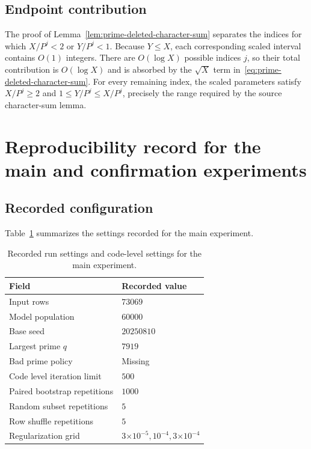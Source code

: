 \documentclass[12pt,reqno]{amsart}
\numberwithin{equation}{section}
\theoremstyle{plain}
\theoremstyle{definition}
\theoremstyle{remark}
\begin{document}
\subsection{Endpoint contribution}

The proof of Lemma~\ref{lem:prime-deleted-character-sum} separates the indices for which $X/P^j<2$ or $Y/P^j<1$.
Because $Y\leq X$, each corresponding scaled interval contains $O(1)$ integers.
There are $O(\log X)$ possible indices $j$, so their total contribution is $O(\log X)$ and is absorbed by the $\sqrt X$ term in~\eqref{eq:prime-deleted-character-sum}.
For every remaining index, the scaled parameters satisfy $X/P^j\geq2$ and $1\leq Y/P^j\leq X/P^j$, precisely the range required by the source character-sum lemma.

\section{Reproducibility record for the main and confirmation experiments}
\label{appReproducibility}

\subsection{Recorded configuration}

Table~\ref{tabManifest} summarizes the settings recorded for the main experiment.

\begin{table}[H]
\centering
\caption{Recorded run settings and code-level settings for the main
experiment.}
\label{tabManifest}
\begin{tabular}{ll}
\toprule
Field & Recorded value\\
\midrule
Input rows & $73069$\\
Model population & $60000$\\
Base seed & $20250810$\\
Largest prime $q$ & $7919$\\
Bad prime policy & Missing\\
Code level iteration limit & $500$\\
Paired bootstrap repetitions & $1000$\\
Random subset repetitions & $5$\\
Row shuffle repetitions & $5$\\
Regularization grid & $3\mathord{\times}10^{-5},10^{-4},3\mathord{\times}10^{-4}$\\
\bottomrule
\end{tabular}
\end{table}
\end{document}

